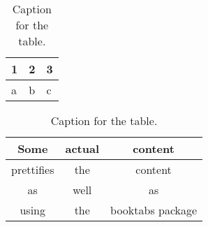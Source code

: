 \documentclass{article}
\begin{document}
\begin{table}[h!]
  \centering
  \caption{Caption for the table.}
  \label{tab:table1}
  \begin{tabular}{l|l||l}
    1 & 2 & 3\\
    \hline
    a & b & c\\
  \end{tabular}
\end{table}


\begin{table}[h!]
  \centering
  \caption{Caption for the table.}
  \label{tab:table2}
  \begin{tabular}{ccc}
    \toprule
    Some & actual & content\\
    \midrule
    prettifies & the & content\\
    as & well & as\\
    using & the & booktabs package\\
    \bottomrule
  \end{tabular}
\end{table}
\end{document}
